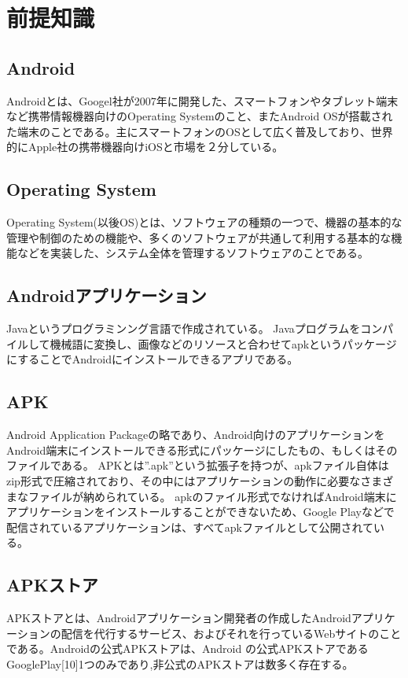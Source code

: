 \newpage
\section{前提知識}

\subsection{Android}
Androidとは、Googel社が2007年に開発した、スマートフォンやタブレット端末など携帯情報機器向けのOperating Systemのこと、またAndroid OSが搭載された端末のことである。主にスマートフォンのOSとして広く普及しており、世界的にApple社の携帯機器向けiOSと市場を２分している。

\subsection{Operating System}
Operating System(以後OS)とは、ソフトウェアの種類の一つで、機器の基本的な管理や制御のための機能や、多くのソフトウェアが共通して利用する基本的な機能などを実装した、システム全体を管理するソフトウェアのことである。

\subsection{Androidアプリケーション}
Javaというプログラミンング言語で作成されている。
Javaプログラムをコンパイルして機械語に変換し、画像などのリソースと合わせてapkというパッケージにすることでAndroidにインストールできるアプリである。

\subsection{APK}
Android Application Packageの略であり、Android向けのアプリケーションをAndroid端末にインストールできる形式にパッケージにしたもの、もしくはそのファイルである。
APKとは”.apk”という拡張子を持つが、apkファイル自体はzip形式で圧縮されており、その中にはアプリケーションの動作に必要なさまざまなファイルが納められている。
apkのファイル形式でなければAndroid端末にアプリケーションをインストールすることができないため、Google Playなどで配信されているアプリケーションは、すべてapkファイルとして公開されている。

\subsection{APKストア}
APKストアとは、Androidアプリケーション開発者の作成したAndroidアプリケーションの配信を代行するサービス、およびそれを行っているWebサイトのことである。Androidの公式APKストアは、Android の公式APKストアであるGooglePlay[10]1つのみであり,非公式のAPKストアは数多く存在する。

